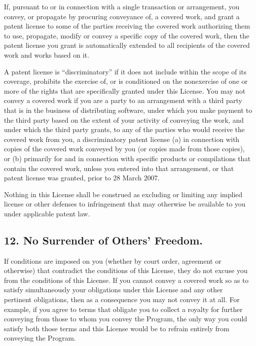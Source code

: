 \documentclass[letterpaper,10pt,english]{sphinxmanual}
\begin{document}
\sphinxAtStartPar
If, pursuant to or in connection with a single transaction or
arrangement, you convey, or propagate by procuring conveyance of, a
covered work, and grant a patent license to some of the parties
receiving the covered work authorizing them to use, propagate, modify
or convey a specific copy of the covered work, then the patent license
you grant is automatically extended to all recipients of the covered
work and works based on it.

\sphinxAtStartPar
A patent license is “discriminatory” if it does not include within
the scope of its coverage, prohibits the exercise of, or is
conditioned on the non\sphinxhyphen{}exercise of one or more of the rights that are
specifically granted under this License.  You may not convey a covered
work if you are a party to an arrangement with a third party that is
in the business of distributing software, under which you make payment
to the third party based on the extent of your activity of conveying
the work, and under which the third party grants, to any of the
parties who would receive the covered work from you, a discriminatory
patent license (a) in connection with copies of the covered work
conveyed by you (or copies made from those copies), or (b) primarily
for and in connection with specific products or compilations that
contain the covered work, unless you entered into that arrangement,
or that patent license was granted, prior to 28 March 2007.

\sphinxAtStartPar
Nothing in this License shall be construed as excluding or limiting
any implied license or other defenses to infringement that may
otherwise be available to you under applicable patent law.


\subsection{12. No Surrender of Others’ Freedom.}
\label{\detokenize{license:no-surrender-of-others-freedom}}
\sphinxAtStartPar
If conditions are imposed on you (whether by court order, agreement or
otherwise) that contradict the conditions of this License, they do not
excuse you from the conditions of this License.  If you cannot convey a
covered work so as to satisfy simultaneously your obligations under this
License and any other pertinent obligations, then as a consequence you may
not convey it at all.  For example, if you agree to terms that obligate you
to collect a royalty for further conveying from those to whom you convey
the Program, the only way you could satisfy both those terms and this
License would be to refrain entirely from conveying the Program.
\end{document}

